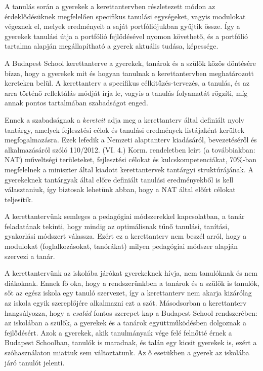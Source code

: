 A tanulás során a gyerekek a kerettantervben részletezett módon az
érdeklődésüknek megfelelően specifikus tanulási egységeket, vagyis modulokat
végeznek el, melyek eredményeit a saját portfóliójukban gyűjtik össze. Így a
gyerekek tanulási útja a portfólió fejlődésével nyomon követhető, és a
portfólió tartalma alapján megállapítható a gyerek aktuális tudása, képessége.

A Budapest School kerettanterve a gyerekek, tanárok és a szülők közös döntésére
bízza, hogy a gyerekek mit és hogyan tanulnak a kerettantervben meghatározott
kereteken belül.
A kerettanterv
a specifikus célkitűzés-tervezés, a tanulás, és az arra történő reflektálás
módját írja le, vagyis a tanulás folyamatát rögzíti, míg annak pontos
tartalmában szabadságot enged.

Ennek a szabadságnak a \emph{kereteit} adja meg a kerettanterv által definiált
nyolv tantárgy, amelyek fejlesztési célok és tanulási eredmények listájaként
kerültek megfogalmazásra. Ezek
lefedik a Nemzeti alaptanterv kiadásáról, bevezetéséről és alkalmazásáról
szóló 110/2012. (VI. 4.) Korm. rendeletben leírt (a továbbiakban: NAT) műveltségi
területeket, fejlesztési célokat és kulcskompetenciákat, 70\%-ban megfelelnek a miniszter által kiadott kerettantervek tantárgyi struktúrájának. A gyerekeknek tantárgyak
által előre definiált tanulási eredményekből is kell
választaniuk, így biztosak lehetünk abban, hogy a NAT által előírt célokat
teljesítik.

A kerettantervünk semleges a pedagógiai módszerekkel kapcsolatban, a tanár
feladatának tekinti, hogy mindig az optimálisnak tűnő tanulási, tanítási,
gyakorlási módszert válassza. Ezért ez a kerettanterv nem beszél arról, hogy a
modulokat (foglalkozásokat, tanórákat) milyen pedagógiai módszer alapján
szervezi a tanár.

A kerettantervünk az iskolába járókat gyerekeknek hívja, nem tanulóknak és nem
diákoknak. Ennek fő oka, hogy a rendszerünkben a tanárok és a szülők is
tanulók, sőt az egész iskola egy tanuló szervezet, így a kerettanterv nem akarja  kizárólag
az iskola egyik szereplőjére alkalmazni ezt a szót. Másodsorban a kerettanterv
hangsúlyozza, hogy a \emph{család} fontos szerepet kap a Budapest School
rendszerében: az iskolában a szülők, a gyerekek és a tanárok együttműködésben dolgoznak
a fejlődésért. Azok a gyerekek, akik tanulmányaik vége felé felnőtté érnek a
Budapest Schoolban, tanulók is maradnak, és talán egy kicsit gyerekek is, ezért
a szóhasználaton miattuk sem változtatunk. Az ő esetükben a gyerek az iskolába
járó tanulót jelenti.


